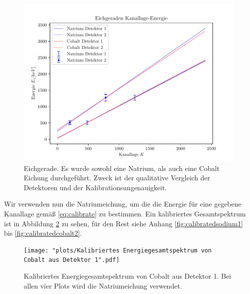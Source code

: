 \documentclass[%
aps,
onecolumn,
11pt,
tightenlines,
nofootinbib,
superscriptaddress,
floatfix,
prd,
]{revtex4-2}
\begin{document}
%

\begin{figure}[H]
	\centering
	\includegraphics[scale=.9]{plots/Eichgeraden.pdf}
	\caption{Eichgerade. Es wurde sowohl eine Natrium, als auch eine Cobalt Eichung durchgeführt. Zweck ist der qualitative Vergleich der Detektoren und der Kalibrationsungenauigkeit.}
	\label{fig:calibratecurve}
\end{figure}
Wir verwenden nun die Natriumeichung, um die die Energie für eine gegebene Kanallage gemäß \ref{eq:calibrate} zu bestimmen. Ein kalibriertes Gesamtspektrum ist in Abbildung \ref{fig:calibratespectrum} zu sehen, für den Rest siehe Anhang \ref{fig:calibratedsodium1} bis \ref{fig:calibratedcobalt2}. 
\begin{figure}[H]
	\centering
	\texttt{[image: "plots/Kalibriertes Energiegesamtspektrum von Cobalt aus Detektor 1".pdf]}
	\caption{Kalibriertes Energiegesamtspektrum von Cobalt aus Detektor 1. Bei allen vier Plots wird die Natriumeichung verwendet.}
	\label{fig:calibratespectrum}
\end{figure}
\end{document}
